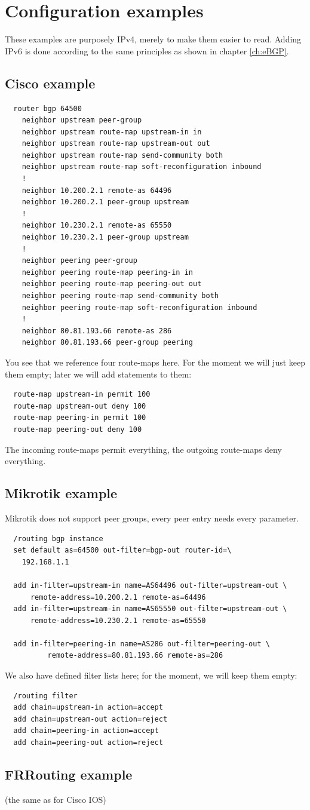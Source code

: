 \section{Configuration examples}
These examples are purposely IPv4, merely to make them easier to read. Adding IPv6 is done according to the same principles as shown in chapter \ref{ch:eBGP}.

\subsection{Cisco example}
\begin{verbatim}
  router bgp 64500
    neighbor upstream peer-group
    neighbor upstream route-map upstream-in in
    neighbor upstream route-map upstream-out out
    neighbor upstream route-map send-community both
    neighbor upstream route-map soft-reconfiguration inbound
    !
    neighbor 10.200.2.1 remote-as 64496
    neighbor 10.200.2.1 peer-group upstream
    !
    neighbor 10.230.2.1 remote-as 65550
    neighbor 10.230.2.1 peer-group upstream
    !
    neighbor peering peer-group
    neighbor peering route-map peering-in in
    neighbor peering route-map peering-out out
    neighbor peering route-map send-community both
    neighbor peering route-map soft-reconfiguration inbound
    !
    neighbor 80.81.193.66 remote-as 286
    neighbor 80.81.193.66 peer-group peering
\end{verbatim}
You see that we reference four route-maps here. For the moment we will just keep them  empty; later we will add statements to them:
\begin{verbatim}
  route-map upstream-in permit 100
  route-map upstream-out deny 100
  route-map peering-in permit 100
  route-map peering-out deny 100
\end{verbatim}
The incoming route-maps permit everything, the outgoing route-maps deny everything.

\subsection{Mikrotik example}
Mikrotik does not support peer groups, every peer entry needs every parameter.
\begin{verbatim}
  /routing bgp instance
  set default as=64500 out-filter=bgp-out router-id=\
    192.168.1.1

  add in-filter=upstream-in name=AS64496 out-filter=upstream-out \
      remote-address=10.200.2.1 remote-as=64496
  add in-filter=upstream-in name=AS65550 out-filter=upstream-out \
      remote-address=10.230.2.1 remote-as=65550

  add in-filter=peering-in name=AS286 out-filter=peering-out \
          remote-address=80.81.193.66 remote-as=286
\end{verbatim}
We also have defined filter lists here; for the moment, we will keep them empty:
\begin{verbatim}
  /routing filter
  add chain=upstream-in action=accept
  add chain=upstream-out action=reject
  add chain=peering-in action=accept
  add chain=peering-out action=reject
\end{verbatim}

\subsection{FRRouting example}
(the same as for Cisco IOS)
